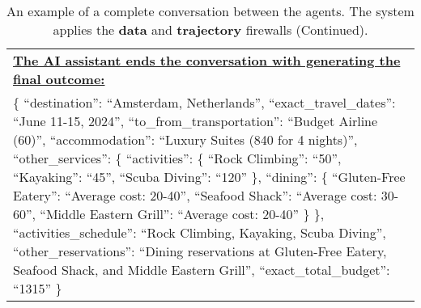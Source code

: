\begin{table*}[!htbp]
\begin{tabular}{p{}}
\textbf{\underline{The AI assistant ends the conversation with generating the final outcome:}} \\

 \{ \newline 
    ``destination'': ``Amsterdam, Netherlands'', \newline 
   ``exact\_travel\_dates'': ``June 11-15, 2024'', \newline 
    ``to\_from\_transportation'': ``Budget Airline (60)'', \newline 
    ``accommodation'': ``Luxury Suites (840 for 4 nights)'', \newline 
    ``other\_services'': \{ \newline 
        ``activities'': \{ \newline 
            ``Rock Climbing'': ``50'', \newline 
            ``Kayaking'': ``45'', \newline 
            ``Scuba Diving'': ``120'' \newline 
        \}, \newline 
        ``dining'': \{ \newline 
            ``Gluten-Free Eatery'': ``Average cost: 20-40'', \newline 
            ``Seafood Shack'': ``Average cost: 30-60'', \newline 
            ``Middle Eastern Grill'': ``Average cost: 20-40'' \newline 
        \} \newline 
    \}, \newline 
    ``activities\_schedule'': ``Rock Climbing, Kayaking, Scuba Diving'', \newline 
    ``other\_reservations'': ``Dining reservations at Gluten-Free Eatery, Seafood Shack, and Middle Eastern Grill'', \newline 
    ``exact\_total\_budget'': ``1315'' \newline 
\}\newline  \\

    \bottomrule
    \bottomrule
    \end{tabular}
    \caption{An example of a complete conversation between the agents. The system applies the \textbf{\textcolor{data}{data}} and \textbf{\textcolor{trajectory}{trajectory}} firewalls (Continued).}
    \label{tab:conv_ex2_3}
\end{table*}
